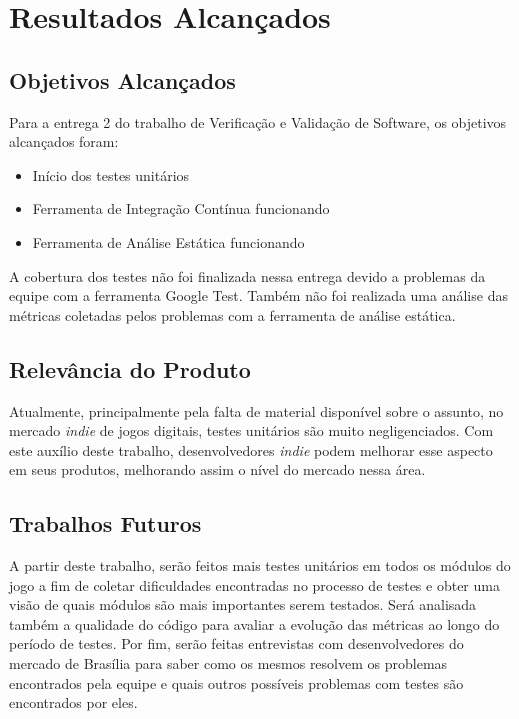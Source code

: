 \chapter[Resultados Alcançados]{Resultados Alcançados}

\section{Objetivos Alcançados}
Para a entrega 2 do trabalho de Verificação e Validação de Software, os objetivos alcançados foram:

\begin{itemize}
\item Início dos testes unitários
\item Ferramenta de Integração Contínua funcionando
\item Ferramenta de Análise Estática funcionando
\end{itemize}

A cobertura dos testes não foi finalizada nessa entrega devido a problemas da equipe com a ferramenta Google Test. Também não foi realizada uma análise das métricas coletadas pelos problemas com a ferramenta de análise estática.

\section{Relevância do Produto}
Atualmente, principalmente pela falta de material disponível sobre o assunto, no mercado \textit{indie} de jogos digitais, testes unitários são muito negligenciados. Com este auxílio deste trabalho, desenvolvedores \textit{indie} podem melhorar esse aspecto em seus produtos, melhorando assim o nível do mercado nessa área.

\section{Trabalhos Futuros}
A partir deste trabalho, serão feitos mais testes unitários em todos os módulos do jogo a fim de coletar dificuldades encontradas no processo de testes e obter uma visão de quais módulos são mais importantes serem testados. Será analisada também a qualidade do código para avaliar a evolução das métricas ao longo do período de testes. Por fim, serão feitas entrevistas com desenvolvedores do mercado de Brasília para saber como os mesmos resolvem os problemas encontrados pela equipe e quais outros possíveis problemas com testes são encontrados por eles. 